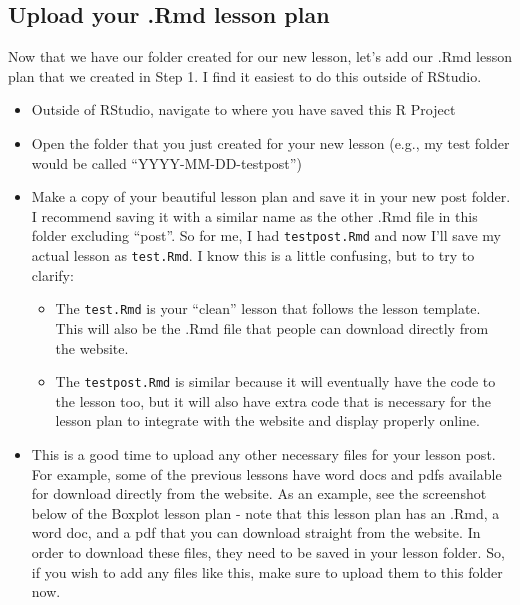 \documentclass[
]{article}
\providecommand{\tightlist}{%
  \setlength{\itemsep}{0pt}\setlength{\parskip}{0pt}}
\begin{document}
\hypertarget{upload-your-.rmd-lesson-plan}{%
\subsection{Upload your .Rmd lesson
plan}\label{upload-your-.rmd-lesson-plan}}

Now that we have our folder created for our new lesson, let's add our
.Rmd lesson plan that we created in Step 1. I find it easiest to do this
outside of RStudio.

\begin{itemize}
\item
  Outside of RStudio, navigate to where you have saved this R Project
\item
  Open the folder that you just created for your new lesson (e.g., my
  test folder would be called ``YYYY-MM-DD-testpost'')
\item
  Make a copy of your beautiful lesson plan and save it in your new post
  folder. I recommend saving it with a similar name as the other .Rmd
  file in this folder excluding ``post''. So for me, I had
  \texttt{testpost.Rmd} and now I'll save my actual lesson as
  \texttt{test.Rmd}. I know this is a little confusing, but to try to
  clarify:

  \begin{itemize}
  \tightlist
  \item
    The \texttt{test.Rmd} is your ``clean'' lesson that follows the
    lesson template. This will also be the .Rmd file that people can
    download directly from the website.
  \item
    The \texttt{testpost.Rmd} is similar because it will eventually have
    the code to the lesson too, but it will also have extra code that is
    necessary for the lesson plan to integrate with the website and
    display properly online.
  \end{itemize}
\item
  This is a good time to upload any other necessary files for your
  lesson post. For example, some of the previous lessons have word docs
  and pdfs available for download directly from the website. As an
  example, see the screenshot below of the Boxplot lesson plan - note
  that this lesson plan has an .Rmd, a word doc, and a pdf that you can
  download straight from the website. In order to download these files,
  they need to be saved in your lesson folder. So, if you wish to add
  any files like this, make sure to upload them to this folder now.
\end{itemize}
\end{document}
